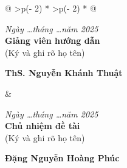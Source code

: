 \documentclass[letterpaper]{article}
\begin{document}
\printbibliography[heading=bibintoc, title={B4. Tài liệu tham khảo}]

\centering
\begin{longtable}[c]{@{}
  >{\centering\arraybackslash}p{(\columnwidth - 2\tabcolsep) * }
  >{\centering\arraybackslash}p{(\columnwidth - 2\tabcolsep) * }@{}}
    \begin{minipage}[b]{\linewidth}\centering
        \emph{Ngày \ldots tháng \ldots năm 2025}\\
        \textbf{Giảng viên hướng dẫn}\\
        (Ký và ghi rõ họ tên)
        
        \vspace{2cm}
        \textbf{ThS. Nguyễn Khánh Thuật}
    \end{minipage} & 
    \begin{minipage}[b]{\linewidth}\centering
        \emph{Ngày \ldots tháng \ldots năm 2025}\\
        \textbf{Chủ nhiệm đề tài}\\
        (Ký và ghi rõ họ tên)
        
        \vspace{2cm}
        \textbf{Đặng Nguyễn Hoàng Phúc}
    \end{minipage} \\
\end{longtable}
\end{document}
